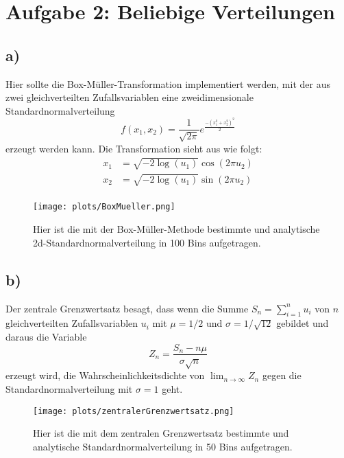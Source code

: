 \newpage
\section{Aufgabe 2: Beliebige Verteilungen}
\label{sec:auf2}

\subsection{a)}
    Hier sollte die Box-Müller-Transformation implementiert werden, mit der aus zwei gleichverteilten Zufallsvariablen eine zweidimensionale Standardnormalverteilung
    \begin{equation}
        f(x_1, x_2)  = \frac{1}{\sqrt{2 \pi}} e^{\frac{-(x_1^2 + x_2^2)^2}{2}}
    \end{equation}
    erzeugt werden kann.
    Die Transformation sieht aus wie folgt:
    \begin{align}
        x_1 &= \sqrt{-2 \log(u_1)} \cos(2 \pi u_2) \\
        x_2 &= \sqrt{-2 \log(u_1)} \sin(2 \pi u_2) \\
    \end{align}
    \begin{figure}[H]
        \centering
        \texttt{[image: plots/BoxMueller.png]} \vspace*{-0.5cm}
        \caption{Hier ist die mit der Box-Müller-Methode bestimmte und analytische 2d-Standardnormalverteilung in 100 Bins aufgetragen.}
        \label{fig:BoxMueller}
    \end{figure}
    \FloatBarrier   

\subsection{b)}
    Der zentrale Grenzwertsatz besagt, dass wenn die Summe $S_n = \sum_{i=1}^n u_i$ von $n$ gleichverteilten Zufallsvariablen $u_i$ mit $\mu = 1/2$ und $\sigma = 1/\sqrt{12}$ gebildet und daraus die Variable
    \begin{equation}
        Z_n = \frac{S_n - n\mu}{\sigma \sqrt{n}}
    \end{equation}
    erzeugt wird, die Wahrscheinlichkeitsdichte von $\lim_{n \rightarrow \infty} Z_n$ gegen die Standardnormalverteilung mit $\sigma=1$ geht.
    
    \begin{figure}[H]
        \centering
        \texttt{[image: plots/zentralerGrenzwertsatz.png]} \vspace*{-0.5cm}
        \caption{Hier ist die mit dem zentralen Grenzwertsatz bestimmte und analytische Standardnormalverteilung in 50 Bins aufgetragen.}
        \label{fig:zentralerGrenzwertsatz}
    \end{figure}
    \FloatBarrier

